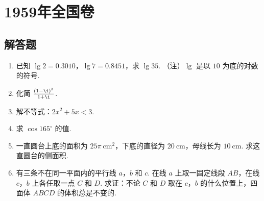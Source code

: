 \chapter{1959年全国卷}

\section{解答题}

\begin{problem}
\begin{enumerate}
\item 已知 \(\lg 2=0.3010\)，\(\lg 7=0.8451\)，求 \(\lg 35\).
（注）\(\lg\) 是以 \(10\) 为底的对数的符号.

\item 化简 \(\frac{\left( 1-\i \right)^3}{1+\i}\).

\item 解不等式：\(2x^2+5x<3\).

\item 求 \(\cos 165^\circ\) 的值.

\item 一直圆台上底的面积为 \(25\pi \mathrm{~cm}^2\)，下底的直径为 \(20 \mathrm{~cm}\)，母线长为 \(10 \mathrm{~cm}\). 求这直圆台的侧面积.

\item 有三条不在同一平面内的平行线 \(a\)，\(b\) 和 \(c\). 在线 \(a\) 上取一固定线段 \(AB\)，在线 \(c\)，\(b\) 上各任取一点 \(C\) 和 \(D\). 求证：不论 \(C\) 和 \(D\) 取在 \(c\)，\(b\) 的什么位置上，四面体 \(ABCD\) 的体积总是不变的.

\end{enumerate}
\end{problem}

